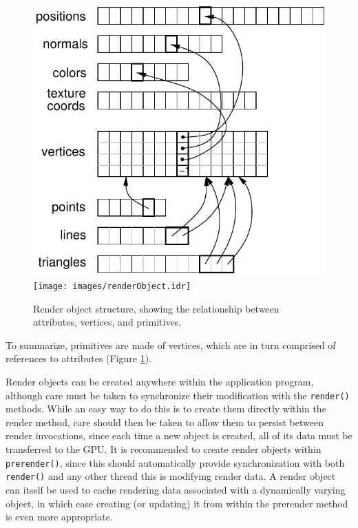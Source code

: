 %
\begin{figure}[t]
\begin{center}
\iflatexml
 \includegraphics[]{images/renderObject}
\else
 \texttt{[image: images/renderObject.idr]}
\fi
\end{center}
\caption{Render object structure, showing the relationship between
attributes, vertices, and primitives.}
\label{renderObject:fig}
\end{figure}
%

To summarize, primitives are made of vertices, which are in turn
comprised of references to attributes (Figure \ref{renderObject:fig}).

Render objects can be created anywhere within the application program,
although care must be taken to synchronize their modification with the
{\tt render()} methods. While an easy way to do this is to create them
directly within the render method, care should then be taken to allow
them to persist between render invocations, since each time a new
object is created, all of its data must be transferred to the GPU. It
is recommended to create render objects within {\tt prerender()},
since this should automatically provide synchronization with both {\tt
render()} and any other thread this is modifying render data.  A
render object can itself be used to cache rendering data associated
with a dynamically varying object, in which case creating (or
updating) it from within the prerender method is even more
appropriate.

